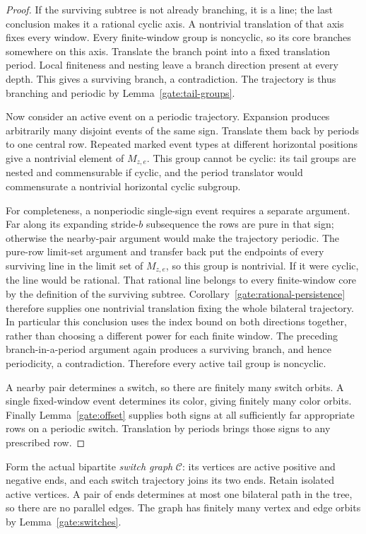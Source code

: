 \begin{proof}
If the surviving subtree is not already branching, it is a line; the last
conclusion makes it a rational cyclic axis.  A nontrivial translation of
that axis fixes every window.  Every finite-window group is noncyclic,
so its core branches somewhere on this axis.  Translate the branch point
into a fixed translation period.  Local finiteness and nesting leave a
branch direction present at every depth.  This gives a surviving branch,
a contradiction.  The trajectory is thus branching and periodic by
Lemma~\ref{gate:tail-groups}.

Now consider an active event on a periodic trajectory.  Expansion produces
arbitrarily many disjoint events of the same sign.  Translate them back
by periods to one central row.  Repeated marked event types at different
horizontal positions give a nontrivial element of $M_{z,e}$.  This group
cannot be cyclic: its tail groups are nested and commensurable if cyclic,
and the period translator would commensurate a nontrivial horizontal
cyclic subgroup.

For completeness, a nonperiodic single-sign event requires a separate
argument.  Far along its expanding stride-$b$ subsequence the rows are
pure in that sign; otherwise the nearby-pair argument would make the
trajectory periodic.  The pure-row limit-set argument and transfer back
put the endpoints of every surviving line in the limit set of $M_{z,e}$,
so this group is nontrivial.  If it were cyclic, the line would be rational.
That rational line belongs to every finite-window core by the
definition of the surviving subtree. Corollary~\ref{gate:rational-persistence}
therefore supplies one nontrivial translation fixing the whole
bilateral trajectory. In particular this conclusion uses the index
bound on both directions together, rather than choosing a different
power for each finite window.
The preceding branch-in-a-period argument again produces a surviving
branch, and hence periodicity, a contradiction.  Therefore every active
tail group is noncyclic.

A nearby pair determines a switch, so there are finitely many switch
orbits.  A single fixed-window event determines its color, giving finitely
many color orbits.  Finally Lemma~\ref{gate:offset} supplies both signs at
all sufficiently far appropriate rows on a periodic switch.  Translation
by periods brings those signs to any prescribed row.
\end{proof}

Form the actual bipartite \emph{switch graph} $\mathcal C$: its vertices
are active positive and negative ends, and each switch trajectory joins
its two ends.  Retain isolated active vertices.  A pair of ends determines
at most one bilateral path in the tree, so there are no parallel edges.
The graph has finitely many vertex and edge orbits by
Lemma~\ref{gate:switches}.

